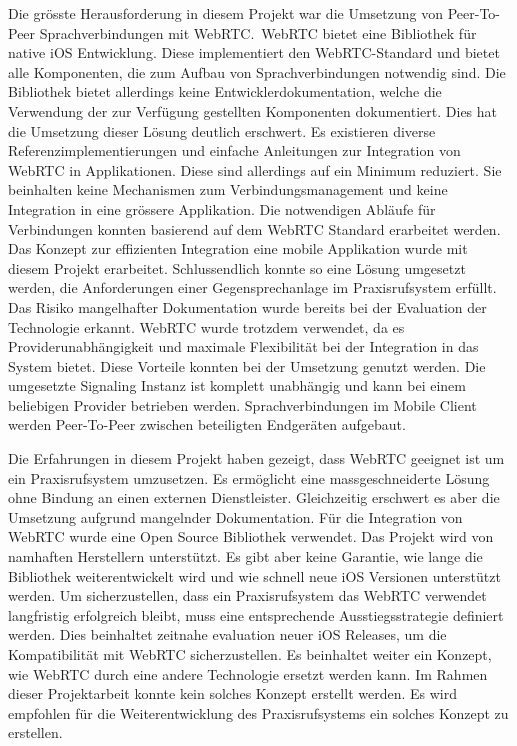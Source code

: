Die grösste Herausforderung in diesem Projekt war die Umsetzung von Peer-To-Peer Sprachverbindungen mit WebRTC.\
WebRTC bietet eine Bibliothek für native iOS Entwicklung.
Diese implementiert den WebRTC-Standard und bietet alle Komponenten, die zum Aufbau von Sprachverbindungen notwendig sind.
Die Bibliothek bietet allerdings keine Entwicklerdokumentation, welche die Verwendung der zur Verfügung gestellten Komponenten dokumentiert.
Dies hat die Umsetzung dieser Lösung deutlich erschwert.
Es existieren diverse Referenzimplementierungen und einfache Anleitungen zur Integration von WebRTC in Applikationen.
Diese sind allerdings auf ein Minimum reduziert.
Sie beinhalten keine Mechanismen zum Verbindungsmanagement und keine Integration in eine grössere Applikation.
Die notwendigen Abläufe für Verbindungen konnten basierend auf dem WebRTC Standard erarbeitet werden.
Das Konzept zur effizienten Integration eine mobile Applikation wurde mit diesem Projekt erarbeitet.
Schlussendlich konnte so eine Lösung umgesetzt werden, die Anforderungen einer Gegensprechanlage im Praxisrufsystem erfüllt.
Das Risiko mangelhafter Dokumentation wurde bereits bei der Evaluation der Technologie erkannt.
WebRTC wurde trotzdem verwendet, da es Providerunabhängigkeit und maximale Flexibilität bei der Integration in das System bietet.
Diese Vorteile konnten bei der Umsetzung genutzt werden.
Die umgesetzte Signaling Instanz ist komplett unabhängig und kann bei einem beliebigen Provider betrieben werden.
Sprachverbindungen im Mobile Client werden Peer-To-Peer zwischen beteiligten Endgeräten aufgebaut.

Die Erfahrungen in diesem Projekt haben gezeigt, dass WebRTC geeignet ist um ein Praxisrufsystem umzusetzen.
Es ermöglicht eine massgeschneiderte Lösung ohne Bindung an einen externen Dienstleister.
Gleichzeitig erschwert es aber die Umsetzung aufgrund mangelnder Dokumentation.
Für die Integration von WebRTC wurde eine Open Source Bibliothek verwendet.
Das Projekt wird von namhaften Herstellern unterstützt.
Es gibt aber keine Garantie, wie lange die Bibliothek weiterentwickelt wird und wie schnell neue iOS Versionen unterstützt werden.
Um sicherzustellen, dass ein Praxisrufsystem das WebRTC verwendet langfristig erfolgreich bleibt, muss eine entsprechende Ausstiegsstrategie definiert werden.
Dies beinhaltet zeitnahe evaluation neuer iOS Releases, um die Kompatibilität mit WebRTC sicherzustellen.
Es beinhaltet weiter ein Konzept, wie WebRTC durch eine andere Technologie ersetzt werden kann.
Im Rahmen dieser Projektarbeit konnte kein solches Konzept erstellt werden.
Es wird empfohlen für die Weiterentwicklung des Praxisrufsystems ein solches Konzept zu erstellen.

